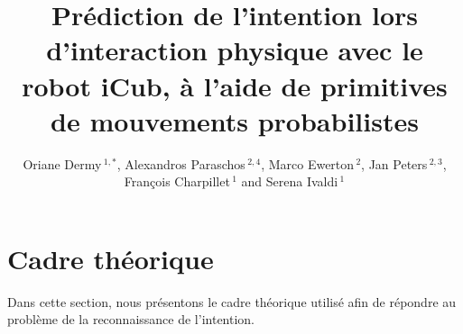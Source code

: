 \documentclass[utf8]{frontiersSCNS} %
\def\firstAuthorLast{Dermy {et~al.}} %
\def\Authors{Oriane Dermy\,$^{1,*}$, Alexandros Paraschos\,$^{2,4}$, Marco Ewerton\,$^{2}$,  Jan Peters\,$^{2,3}$, Fran\c cois Charpillet\,$^{1}$ and Serena Ivaldi\,$^{1}$}
\begin{document}
\onecolumn
{}

\title[Prédiction de l'intention lors d'interaction avec le robot iCub]{Prédiction de l'intention lors d'interaction physique avec le robot iCub, à l'aide de primitives de mouvements probabilistes} 

\author[\firstAuthorLast ]{\Authors} %
\address{} %
\correspondance{} %

\extraAuth{}%


\maketitle

\section{Cadre théorique}
\label{sec:theory}

Dans cette section, nous présentons le cadre théorique utilisé afin de répondre au problème de la reconnaissance de l'intention. 

\end{document}

